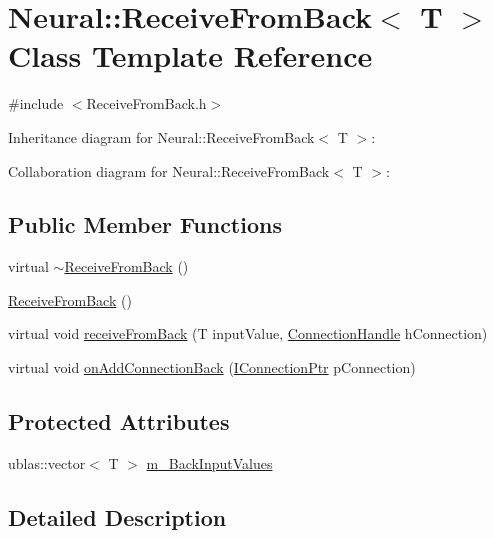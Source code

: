 \hypertarget{class_neural_1_1_receive_from_back}{
\section{Neural::ReceiveFromBack$<$ T $>$ Class Template Reference}
\label{class_neural_1_1_receive_from_back}
}


{\ttfamily \#include $<$ReceiveFromBack.h$>$}



Inheritance diagram for Neural::ReceiveFromBack$<$ T $>$:


Collaboration diagram for Neural::ReceiveFromBack$<$ T $>$:
\subsection*{Public Member Functions}
\begin{DoxyCompactItemize}
\item 
virtual \hyperlink{class_neural_1_1_receive_from_back_a95573cdc588083c0a624dc843ed68c51}{$\sim$ReceiveFromBack} ()
\item 
\hyperlink{class_neural_1_1_receive_from_back_a3fb2eb2d91e7dea9792ba0ce5a1bbd75}{ReceiveFromBack} ()
\item 
virtual void \hyperlink{class_neural_1_1_receive_from_back_afe67c2ff517cd4a58dec621ef326e037}{receiveFromBack} (T inputValue, \hyperlink{namespace_neural_a73b2763d14999ad4308dbf4246aa503f}{ConnectionHandle} hConnection)
\item 
virtual void \hyperlink{class_neural_1_1_receive_from_back_a8403694f8698465fe21afcba2d0f494a}{onAddConnectionBack} (\hyperlink{class_neural_1_1_i_node_a5243be0a422bcddc5a71a79920d09fd1}{IConnectionPtr} pConnection)
\end{DoxyCompactItemize}
\subsection*{Protected Attributes}
\begin{DoxyCompactItemize}
\item 
ublas::vector$<$ T $>$ \hyperlink{class_neural_1_1_receive_from_back_a39008175a506f3f17d8459a9caa45f59}{m\_\-BackInputValues}
\end{DoxyCompactItemize}


\subsection{Detailed Description}
